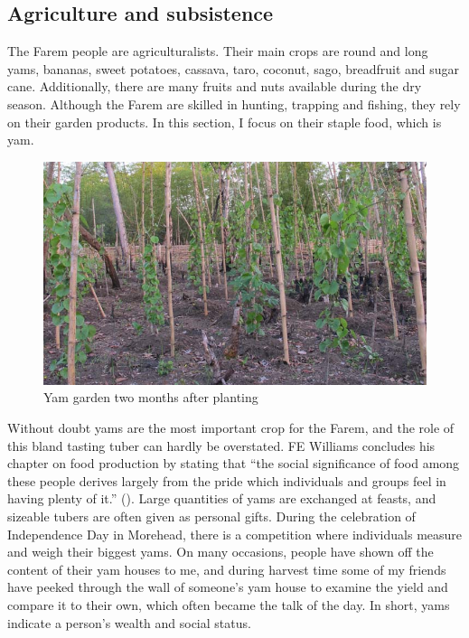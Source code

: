 \subsection{Agriculture and subsistence}\label{agriculture}

The Farem people are agriculturalists. Their main crops are round and long yams, bananas, sweet potatoes, cassava, taro, coconut, sago, breadfruit and sugar cane. Additionally, there are many fruits and nuts available during the dry season. Although the Farem are skilled in hunting, trapping and fishing, they rely on their garden products. In this section, I focus on their staple food, which is yam.

\begin{figure}
    \includegraphics[width=.9\textwidth]{figures/yam1.jpg}
  \caption[Yam garden two months after planting]{Yam garden two months after planting}
  \label{fig:yam1}
\end{figure}

Without doubt yams are the most important crop for the Farem, and the role of this bland tasting tuber can hardly be overstated. FE Williams concludes his chapter on food production by stating that ``the social significance of food among these people derives largely from the pride which individuals and groups feel in having plenty of it.'' (\citeyear[235]{Williams:1936transfly}). Large quantities of yams are exchanged at feasts, and sizeable tubers are often given as personal gifts. During the celebration of Independence Day in Morehead, there is a competition where individuals measure and weigh their biggest yams. On many occasions, people have shown off the content of their yam houses to me, and during harvest time some of my friends have peeked through the wall of someone's yam house to examine the yield and compare it to their own, which often became the talk of the day. In short, yams indicate a person's wealth and social status.%

